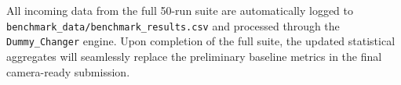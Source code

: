 \documentclass{svproc}
\begin{document}
All incoming data from the full 50-run suite are automatically logged to \texttt{benchmark\_data/}\allowbreak\texttt{benchmark\_results.csv} and processed through the \texttt{Dummy\_Changer} engine. Upon completion of the full suite, the updated statistical aggregates will seamlessly replace the preliminary baseline metrics in the final camera-ready submission.
\end{document}
